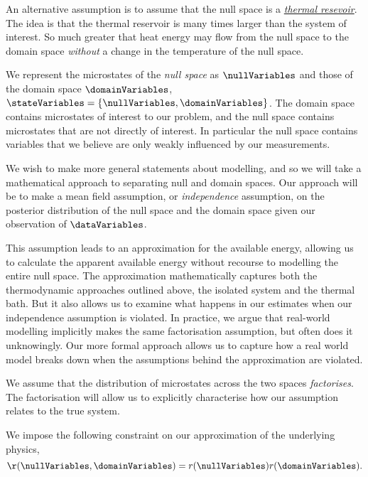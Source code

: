 An alternative assumption is to assume that the null
space is a \href{https://en.wikipedia.org/wiki/Thermal_reservoir}{\emph{thermal
resevoir}}.  The idea is that the thermal reservoir is many times larger than the system of interest. So much greater that heat energy may flow from the null space to the domain
space \emph{without} a change in the temperature of the null space.

We represent the microstates of the \emph{null space} as
\(\nullVariables\) and those of the domain space \(\domainVariables\),
\(\stateVariables = \{\nullVariables, \domainVariables\}\). The domain
space contains microstates of interest to our problem, and the null
space contains microstates that are not directly of interest. In
particular the null space contains variables that we believe are only
weakly influenced by our measurements.

We wish to make more general statements about modelling, and so we will take a mathematical approach to separating null and domain spaces. Our approach will be to make a mean field assumption, or \emph{independence} assumption, on the posterior distribution of the null space and the domain space given our observation of $\dataVariables$.

This assumption leads to an approximation for the available energy, allowing us to calculate the apparent available energy without recourse to modelling the entire null space. The approximation mathematically captures both the thermodynamic approaches outlined above, the isolated system and the thermal bath. But it also allows us to examine what happens in our estimates when our independence assumption is violated. In practice, we argue that real-world modelling implicitly makes the same factorisation assumption, but often does it unknowingly. Our more formal approach allows us to capture how a real world model breaks down when the assumptions behind the approximation are violated.

We assume that the distribution of microstates across the two spaces
\emph{factorises}. The factorisation will allow us to explicitly
characterise how our assumption relates to the true system. 

We impose the following constraint on our approximation of the underlying physics, 
\[
\r(\nullVariables, \domainVariables) = r(\nullVariables) r(\domainVariables).
\]

